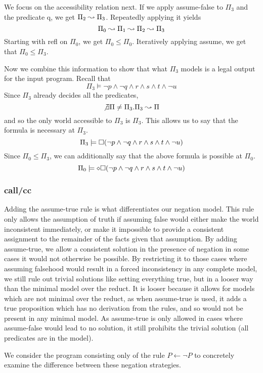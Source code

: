 We focus on the accessibility relation next.
If we apply assume-false to $\Pi_3$ and the predicate q, we get $\Pi_2 \leadsto \Pi_3$.
Repeatedly applying it yields
\[
	\Pi_0 \leadsto \Pi_1 \leadsto \Pi_2 \leadsto \Pi_3
\]
Starting with refl on $\Pi_0$, we get $\Pi_0 \leq \Pi_0$.
Iteratively applying assume, we get that $\Pi_0 \leq \Pi_3$.

Now we combine this information to show that what $\Pi_3$ models is a legal output for the input program.
Recall that
\[
	\Pi_3 \models \neg p \wedge \neg q \wedge r \wedge s \wedge t \wedge \neg u
\]
Since $\Pi_3$ already decides all the predicates,
\[
	\not \exists \Pi \neq \Pi_3 . \Pi_3 \leadsto \Pi
\]
and so the only world accessible to $\Pi_3$ is $\Pi_3$.
This allows us to say that the formula is necessary at $\Pi_3$.
\[
	\Pi_3 \models \square (\neg p \wedge \neg q \wedge r \wedge s \wedge t \wedge \neg u)
\] 
Since $\Pi_0 \leq \Pi_3$, we can additionally say that the above formula is possible at $\Pi_0$.
\[
	\Pi_0 \models \diamond \square (\neg p \wedge \neg q \wedge r \wedge s \wedge t \wedge \neg u)
\]

\subsubsection{call/cc}
Adding the assume-true rule is what differentiates our negation model.
This rule only allows the assumption of truth if assuming false would either make the world inconsistent immediately, or make it impossible to provide a consistent assignment to the remainder of the facts given that assumption.
By adding assume-true, we allow a consistent solution in the presence of negation in some cases it would not otherwise be possible.
By restricting it to those cases where assuming falsehood would result in a forced inconsistency in any complete model, we still rule out trivial solutions like setting everything true, but in a looser way than the minimal model over the reduct.
It is looser because it allows for models which are not minimal over the reduct, as when assume-true is used, it adds a true proposition which has no derivation from the rules, and so would not be present in any minimal model.
As assume-true is only allowed in cases where assume-false would lead to no solution, it still prohibits the trivial solution (all predicates are in the model).

We consider the program consisting only of the rule $P \leftarrow \neg P$ to concretely examine the difference between these negation strategies.


